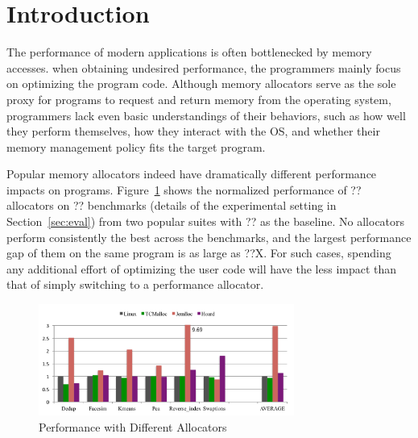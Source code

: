 

\section{Introduction}


The performance of modern applications is often bottlenecked by memory accesses. when obtaining undesired performance, the programmers mainly focus on optimizing the program code. Although memory allocators serve as the sole proxy for programs to request and return memory from the operating system, programmers lack even basic understandings of their behaviors, such as how well they perform themselves, how they interact with the OS, and whether their memory management policy fits the target program. 

Popular memory allocators indeed have dramatically different performance impacts on programs. Figure~\ref{fig:motivation} shows the normalized performance of ?? allocators on ?? benchmarks (details of the experimental setting in Section~\ref{sec:eval}) from two popular suites with ?? as the baseline. No allocators perform consistently the best across the benchmarks, and the largest performance gap of them on the same program is as large as ??X. For such cases, spending any additional effort of optimizing the user code will have the less impact than that of simply switching to a performance allocator.

\begin{figure}[!ht]
\centering
\includegraphics[width=3.3in]{figures/motivation}
\caption{Performance with Different Allocators\label{fig:motivation}}
\end{figure}

